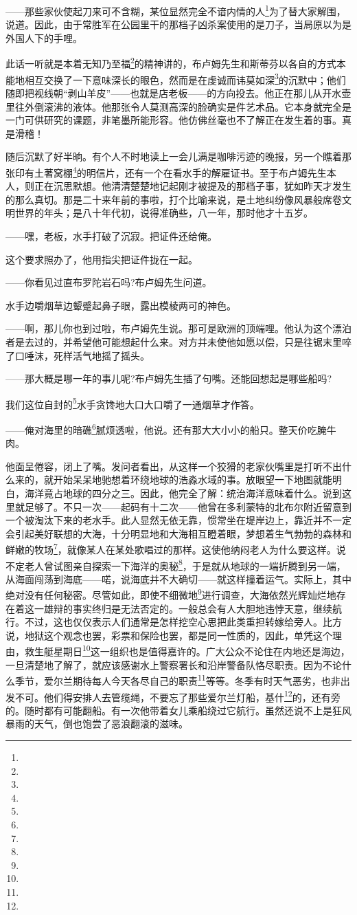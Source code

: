 \par ——那些家伙使起刀来可不含糊，某位显然完全不谙内情的人\footnote{}为了替大家解围，说道。因此，由于常胜军在公园里干的那档子凶杀案使用的是刀子，当局原以为是外国人下的手哩。
\par 此话一听就是本着无知乃至福\footnote{}的精神讲的，布卢姆先生和斯蒂芬以各自的方式本能地相互交换了一下意味深长的眼色，然而是在虔诚而讳莫如深\footnote{}的沉默中；他们随即把视线朝“剥山羊皮”——也就是店老板——的方向投去。他正在那儿从开水壶里往外倒滚沸的液体。他那张令人莫测高深的脸确实是件艺术品。它本身就完全是一门可供研究的课题，非笔墨所能形容。他仿佛丝毫也不了解正在发生着的事。真是滑稽！
\par 随后沉默了好半晌。有个人不时地读上一会儿满是咖啡污迹的晚报，另一个瞧着那张印有土著窝棚\footnote{}的明信片，还有一个在看水手的解雇证书。至于布卢姆先生本人，则正在沉思默想。他清清楚楚地记起刚才被提及的那档子事，犹如昨天才发生的那么真切。那是二十来年前的事啦，打个比喻来说，是土地纠纷像风暴般席卷文明世界的年头；是八十年代初，说得准确些，八一年，那时他才十五岁。
\par ——嘿，老板，水手打破了沉寂。把证件还给俺。
\par 这个要求照办了，他用指尖把证件拢在一起。
\par ——你看见过直布罗陀岩石吗?布卢姆先生问道。
\par 水手边嚼烟草边颦蹙起鼻子眼，露出模棱两可的神色。
\par ——啊，那儿你也到过啦，布卢姆先生说。那可是欧洲的顶端哩。他认为这个漂泊者是去过的，并希望他可能想起什么来。对方并未使他如愿以偿，只是往锯末里啐了口唾沫，死样活气地摇了摇头。
\par ——那大概是哪一年的事儿呢?布卢姆先生插了句嘴。还能回想起是哪些船吗?
\par 我们这位自封的\footnote{}水手贪馋地大口大口嚼了一通烟草才作答。
\par ——俺对海里的暗礁\footnote{}腻烦透啦，他说。还有那大大小小的船只。整天价吃腌牛肉。
\par 他面呈倦容，闭上了嘴。发问者看出，从这样一个狡猾的老家伙嘴里是打听不出什么来的，就开始呆呆地驰想着环绕地球的浩淼水域的事。放眼望一下地图就能明白，海洋竟占地球的四分之三。因此，他完全了解：统治海洋意味着什么。说到这里就足够了。不只一次——起码有十二次——他曾在多利蒙特的北布尔附近留意到一个被淘汰下来的老水手。此人显然无依无靠，惯常坐在堤岸边上，靠近并不一定会引起美好联想的大海，十分明显地和大海相互瞪着眼，梦想着生气勃勃的森林和鲜嫩的牧场\footnote{}，就像某人在某处歌唱过的那样。这使他纳闷老人为什么要这样。说不定老人曾试图亲自探索一下海洋的奥秘\footnote{}，于是就从地球的一端折腾到另一端，从海面闯荡到海底——喏，说海底并不大确切——就这样撞着运气。实际上，其中绝对没有任何秘密。尽管如此，即使不细微地\footnote{}进行调查，大海依然光辉灿烂地存在着这一雄辩的事实终归是无法否定的。一般总会有人大胆地违悖天意，继续航行。不过，这也仅仅表示人们通常是怎样挖空心思把此类重担转嫁给旁人。比方说，地狱这个观念也罢，彩票和保险也罢，都是同一性质的，因此，单凭这个理由，救生艇星期日\footnote{}这一组织也是值得嘉许的。广大公众不论住在内地还是海边，一旦清楚地了解了，就应该感谢水上警察署长和沿岸警备队恪尽职责。因为不论什么季节，爱尔兰期待每人今天各尽自己的职责\footnote{}等等。冬季有时天气恶劣，也非出发不可。他们得安排人去管缆绳，不要忘了那些爱尔兰灯船，基什\footnote{}的，还有旁的。随时都有可能翻船。有一次他带着女儿乘船绕过它航行。虽然还说不上是狂风暴雨的天气，倒也饱尝了恶浪翻滚的滋味。
